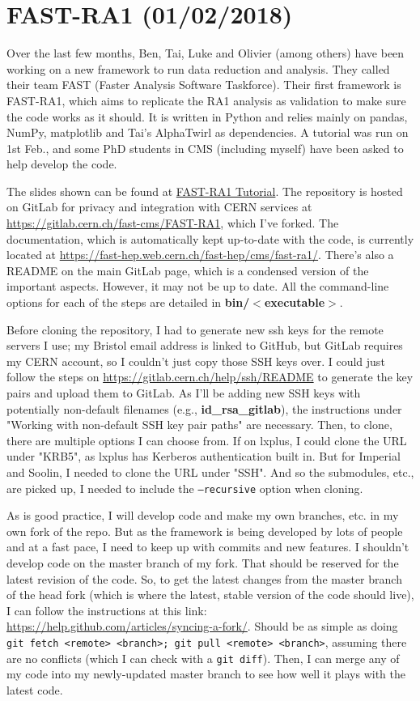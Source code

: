 \newpage
\section{FAST-RA1 (01/02/2018)}
\label{sec:fast-ra1}

Over the last few months, Ben, Tai, Luke and Olivier (among others) have been working on a new framework to run data reduction and analysis. They called their team FAST (Faster Analysis Software Taskforce). Their first framework is FAST-RA1, which aims to replicate the RA1 analysis as validation to make sure the code works as it should. It is written in Python and relies mainly on pandas, NumPy, matplotlib and Tai's AlphaTwirl as dependencies. A tutorial was run on 1st Feb., and some PhD students in CMS (including myself) have been asked to help develop the code.

The slides shown can be found at \href{run:sec36/FAST-RA1 Tutorial.pdf}{FAST-RA1 Tutorial}. The repository is hosted on GitLab for privacy and integration with CERN services at \url{https://gitlab.cern.ch/fast-cms/FAST-RA1}, which I've forked. The documentation, which is automatically kept up-to-date with the code, is currently located at \url{https://fast-hep.web.cern.ch/fast-hep/cms/fast-ra1/}. There's also a README on the main GitLab page, which is a condensed version of the important aspects. However, it may not be up to date. All the command-line options for each of the steps are detailed in \textbf{bin/$<$executable$>$}. 

Before cloning the repository, I had to generate new ssh keys for the remote servers I use; my Bristol email address is linked to GitHub, but GitLab requires my CERN account, so I couldn't just copy those SSH keys over. I could just follow the steps on \url{https://gitlab.cern.ch/help/ssh/README} to generate the key pairs and upload them to GitLab. As I'll be adding new SSH keys with potentially non-default filenames (e.g., \textbf{id\_rsa\_gitlab}), the instructions under "Working with non-default SSH key pair paths" are necessary. Then, to clone, there are multiple options I can choose from. If on lxplus, I could clone the URL under "KRB5", as lxplus has Kerberos authentication built in. But for Imperial and Soolin, I needed to clone the URL under "SSH". And so the submodules, etc., are picked up, I needed to include the \texttt{--recursive} option when cloning.

As is good practice, I will develop code and make my own branches, etc. in my own fork of the repo. But as the framework is being developed by lots of people and at a fast pace, I need to keep up with commits and new features. I shouldn't develop code on the master branch of my fork. That should be reserved for the latest revision of the code. So, to get the latest changes from the master branch of the head fork (which is where the latest, stable version of the code should live), I can follow the instructions at this link: \url{https://help.github.com/articles/syncing-a-fork/}. Should be as simple as doing \texttt{git fetch <remote> <branch>; git pull <remote> <branch>}, assuming there are no conflicts (which I can check with a \texttt{git diff}). Then, I can merge any of my code into my newly-updated master branch to see how well it plays with the latest code.


